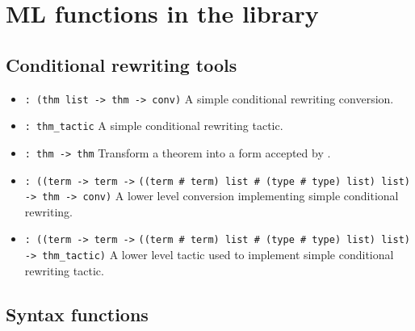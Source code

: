 \section{ML functions in the library}

\subsection*{Conditional rewriting tools}

\begin{itemize}
\item {} \verb|: (thm list -> thm -> conv)|\newline
A simple conditional rewriting conversion.

\item {} \verb|: thm_tactic|\newline
A simple conditional rewriting tactic.

\item {} \verb|: thm -> thm|\newline
Transform a theorem into a form accepted by .

\item {} \linebreak
\verb|: ((term -> term ->| \verb|((term # term) list # (type # type) list) list)|
\verb| -> thm -> conv)|\newline
A lower level conversion implementing simple conditional rewriting.

\item {}\linebreak
\verb|: ((term -> term ->| \verb|((term # term) list # (type # type) list) list)|
\verb|-> thm_tactic)|\newline
A lower level tactic used to implement simple conditional rewriting tactic.
\end{itemize}

\subsection*{Syntax functions}


